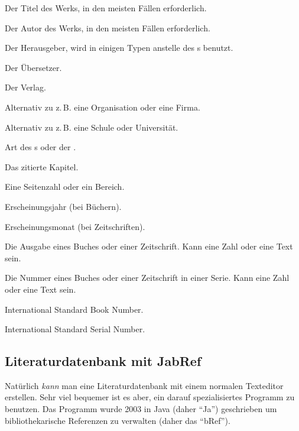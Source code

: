 \begin{labeling}{}
\item[\meta{title}]       Der Titel des Werks, in den meisten Fällen erforderlich.
\item[\meta{author}]      Der Autor des Werks, in den meisten Fällen erforderlich.
\item[\meta{editor}]      Der Herausgeber, wird in einigen Typen anstelle des s benutzt.
\item[\meta{translator}]  Der Übersetzer.
\item[\meta{publisher}]   Der Verlag.
\item[\meta{organization}] Alternativ zu  z.\,B. eine Organisation oder eine Firma.
\item[\meta{institution}] Alternativ zu  z.\,B. eine Schule oder Universität.
\item[\meta{type}]        Art des s oder der .
%
\item[\meta{chapter}]     Das zitierte Kapitel.
\item[\meta{pages}]       Eine Seitenzahl oder ein Bereich.
%
\item[\meta{year}]        Erscheinungsjahr (bei Büchern).
\item[\meta{month}]       Erscheinungsmonat (bei Zeitschriften).
\item[\meta{issue}]       Die Ausgabe eines Buches oder einer Zeitschrift.
        Kann eine Zahl oder eine Text sein.
\item[\meta{number}]      Die Nummer eines Buches oder einer Zeitschrift in einer Serie.
        Kann eine Zahl oder eine Text sein.
%
\item[\meta{isbn}]  International Standard Book Number. 
\item[\meta{issn}]  International Standard Serial Number. 
\end{labeling}

\subsection{Literaturdatenbank mit JabRef}

Natürlich \emph{kann} man eine Literaturdatenbank mit einem normalen Texteditor erstellen.
Sehr viel bequemer ist es aber, ein darauf spezialisiertes Programm zu benutzen.
Das Programm wurde 2003 in Java (daher \enquote{Ja}) geschrieben um bibliothekarische Referenzen zu verwalten
(daher das \enquote{bRef}).

